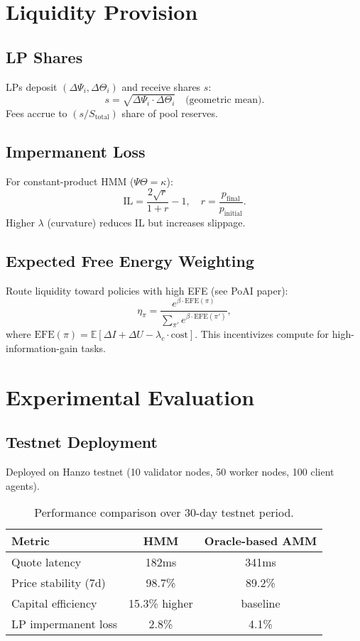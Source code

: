 \documentclass[11pt]{article}
\begin{document}
\section{Liquidity Provision}
\subsection{LP Shares}
LPs deposit \((\Delta\Psi_i, \Delta\Theta_i)\) and receive shares \(s\):
\begin{equation}
s = \sqrt{\Delta\Psi_i \cdot \Delta\Theta_i} \quad \text{(geometric mean)}.
\end{equation}
Fees accrue to \((s / S_{\text{total}})\) share of pool reserves.

\subsection{Impermanent Loss}
For constant-product HMM (\(\Psi\Theta = \kappa\)):
\begin{equation}
\text{IL} = \frac{2\sqrt{r}}{1 + r} - 1, \quad r = \frac{p_{\text{final}}}{p_{\text{initial}}}.
\end{equation}
Higher \(\lambda\) (curvature) reduces IL but increases slippage.

\subsection{Expected Free Energy Weighting}
Route liquidity toward policies with high EFE (see PoAI paper):
\begin{equation}
\eta_{\pi} = \frac{e^{\beta \cdot \text{EFE}(\pi)}}{\sum_{\pi'} e^{\beta \cdot \text{EFE}(\pi')}},
\end{equation}
where \(\text{EFE}(\pi) = \mathbb{E}[\Delta I + \Delta U - \lambda_c \cdot \text{cost}]\). This incentivizes compute for high-information-gain tasks.

\section{Experimental Evaluation}
\subsection{Testnet Deployment}
Deployed on Hanzo testnet (10 validator nodes, 50 worker nodes, 100 client agents).

\begin{table}[h]
\centering
\begin{tabular}{lcc}
\toprule
Metric & HMM & Oracle-based AMM \\
\midrule
Quote latency & 182ms & 341ms \\
Price stability (7d) & 98.7\% & 89.2\% \\
Capital efficiency & 15.3\% higher & baseline \\
LP impermanent loss & 2.8\% & 4.1\% \\
\bottomrule
\end{tabular}
\caption{Performance comparison over 30-day testnet period.}
\end{table}
\end{document}
